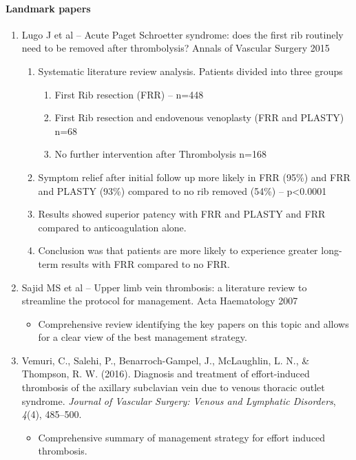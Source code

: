 \documentclass[
]{book}
\providecommand{\tightlist}{%
  \setlength{\itemsep}{0pt}\setlength{\parskip}{0pt}}
\begin{document}
\hypertarget{landmark-papers}{%
\paragraph{Landmark papers}\label{landmark-papers}}

\begin{enumerate}
\def\labelenumi{\arabic{enumi}.}
\item
  Lugo J et al -- Acute Paget Schroetter syndrome: does the first rib
  routinely need to be removed after thrombolysis? Annals of Vascular
  Surgery 2015 \citep{lugoAcutePagetSchroetter2015}

  \begin{enumerate}
  \def\labelenumii{\arabic{enumii}.}
  \item
    Systematic literature review analysis. Patients divided into
    three groups

    \begin{enumerate}
    \def\labelenumiii{\arabic{enumiii}.}
    \item
      First Rib resection (FRR) -- n=448
    \item
      First Rib resection and endovenous venoplasty (FRR and
      PLASTY) n=68
    \item
      No further intervention after Thrombolysis n=168
    \end{enumerate}
  \item
    Symptom relief after initial follow up more likely in FRR (95\%)
    and FRR and PLASTY (93\%) compared to no rib removed (54\%) --
    p\textless0.0001
  \item
    Results showed superior patency with FRR and PLASTY and FRR
    compared to anticoagulation alone.
  \item
    Conclusion was that patients are more likely to experience
    greater long-term results with FRR compared to no FRR.
  \end{enumerate}
\item
  Sajid MS et al -- Upper limb vein thrombosis: a literature review to
  streamline the protocol for management. Acta Haematology 2007
  \citep{sajidUpperLimbDeep2007}

  \begin{itemize}
  \tightlist
  \item
    Comprehensive review identifying the key papers on this topic
    and allows for a clear view of the best management strategy.
  \end{itemize}
\item
  Vemuri, C., Salehi, P., Benarroch-Gampel, J., McLaughlin, L. N., \&
  Thompson, R. W. (2016). Diagnosis and treatment of effort-induced
  thrombosis of the axillary subclavian vein due to venous thoracic
  outlet syndrome. \emph{Journal of Vascular Surgery: Venous and Lymphatic
  Disorders}, \emph{4}(4), 485--500.
  \citep{vemuriDiagnosisTreatmentEffortinduced2016}

  \begin{itemize}
  \tightlist
  \item
    Comprehensive summary of management strategy for effort induced
    thrombosis.
  \end{itemize}
\end{enumerate}
\end{document}
